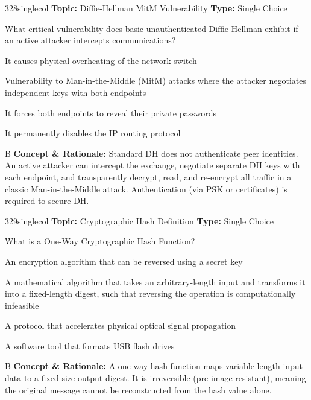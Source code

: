 \begin{qcard}{328}{singlecol}
\textcolor{darkslate!75}{\small\textbf{Topic:} Diffie-Hellman MitM Vulnerability \hfill \textbf{Type:} Single Choice}\vspace{0.4em}\par
What critical vulnerability does basic unauthenticated Diffie-Hellman exhibit if an active attacker intercepts communications?
\begin{qoptions}
\item It causes physical overheating of the network switch
\item Vulnerability to Man-in-the-Middle (MitM) attacks where the attacker negotiates independent keys with both endpoints
\item It forces both endpoints to reveal their private passwords
\item It permanently disables the IP routing protocol
\end{qoptions}
\end{qcard}
\nopagebreak
\begin{explainbox}{B}
\textbf{Concept \& Rationale:} Standard DH does not authenticate peer identities. An active attacker can intercept the exchange, negotiate separate DH keys with each endpoint, and transparently decrypt, read, and re-encrypt all traffic in a classic Man-in-the-Middle attack. Authentication (via PSK or certificates) is required to secure DH.
\end{explainbox}

\begin{qcard}{329}{singlecol}
\textcolor{darkslate!75}{\small\textbf{Topic:} Cryptographic Hash Definition \hfill \textbf{Type:} Single Choice}\vspace{0.4em}\par
What is a One-Way Cryptographic Hash Function?
\begin{qoptions}
\item An encryption algorithm that can be reversed using a secret key
\item A mathematical algorithm that takes an arbitrary-length input and transforms it into a fixed-length digest, such that reversing the operation is computationally infeasible
\item A protocol that accelerates physical optical signal propagation
\item A software tool that formats USB flash drives
\end{qoptions}
\end{qcard}
\nopagebreak
\begin{explainbox}{B}
\textbf{Concept \& Rationale:} A one-way hash function maps variable-length input data to a fixed-size output digest. It is irreversible (pre-image resistant), meaning the original message cannot be reconstructed from the hash value alone.
\end{explainbox}

